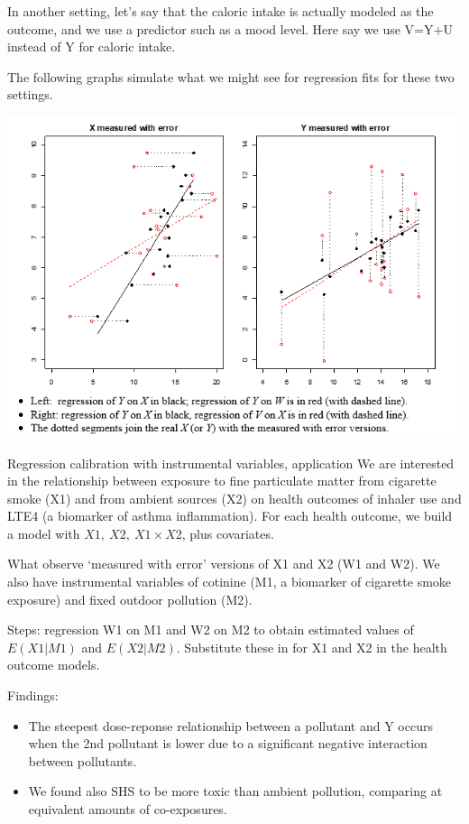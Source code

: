 \documentclass[
  9pt,
  ignorenonframetext,
]{beamer}
\begin{document}
\begin{frame}{}
\protect\hypertarget{section-7}{}
In another setting, let's say that the caloric intake is actually
modeled as the outcome, and we use a predictor such as a mood level.
Here say we use V=Y+U instead of Y for caloric intake.

The following graphs simulate what we might see for regression fits for
these two settings.

\begin{center}\includegraphics[width=0.7\linewidth]{figs_L22/f1} \end{center}
\end{frame}

\begin{frame}{Regression calibration with instrumental variables,
application}
\protect\hypertarget{regression-calibration-with-instrumental-variables-application}{}
We are interested in the relationship between exposure to fine
particulate matter from cigarette smoke (X1) and from ambient sources
(X2) on health outcomes of inhaler use and LTE4 (a biomarker of asthma
inflammation). For each health outcome, we build a model with
\(X1,\ X2,\ X1 \times X2\), plus covariates.

What observe `measured with error' versions of X1 and X2 (W1 and W2). We
also have instrumental variables of cotinine (M1, a biomarker of
cigarette smoke exposure) and fixed outdoor pollution (M2).

Steps: regression W1 on M1 and W2 on M2 to obtain estimated values of
\(E(X1|M1)\) and \(E(X2|M2)\). Substitute these in for X1 and X2 in the
health outcome models.
\end{frame}

\begin{frame}{}
\protect\hypertarget{section-8}{}
Findings:

\begin{itemize}
\item
  The steepest dose-reponse relationship between a pollutant and Y
  occurs when the 2nd pollutant is lower due to a significant negative
  interaction between pollutants.
\item
  We found also SHS to be more toxic than ambient pollution, comparing
  at equivalent amounts of co-exposures.
\end{itemize}
\end{frame}
\end{document}
